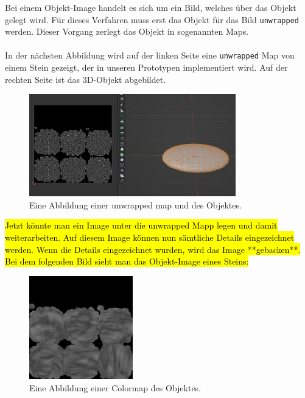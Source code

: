 Bei einem Objekt-Image handelt es sich um ein Bild, welches über das Objekt gelegt wird. Für dieses Verfahren muss erst das Objekt für das Bild \verb+unwrapped+ werden. Dieser Vorgang zerlegt das Objekt in sogenannten Maps.\\\\
In der nächsten Abbildung wird auf der linken Seite eine \verb+unwrapped+ Map von einem Stein gezeigt, der in unseren Prototypen implementiert wird. Auf der rechten Seite ist das 3D-Objekt abgebildet.


\begin{figure}[H]
    \centering
    \includegraphics[width=0.8\textwidth]{chapters/11/Images/StoneAndUnwrap.png}
    \caption{Eine Abbildung einer unwrapped map und des Objektes.}
    \label{htl01}
\end{figure}

\noindent \hl{Jetzt könnte man ein Image unter die unwrapped Mapp legen und damit weiterarbeiten. Auf diesem Image können nun sämtliche Details eingezeichnet werden. Wenn die Details eingezeichnet wurden, wird das Image **gebacken**. Bei dem folgenden Bild sieht man das Objekt-Image eines Steins:} %

\begin{figure}[H]
    \centering
    \includegraphics[width=0.4\textwidth]{chapters/11/Images/SteinColor.png}
    \caption{Eine Abbildung einer Colormap des Objektes.}
    \label{htl01}
\end{figure}

